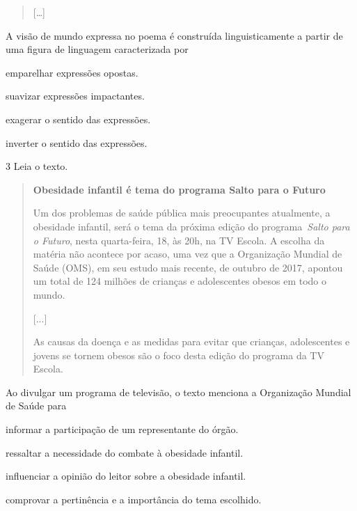 \begin{quote}
{[}\ldots{]}
\end{quote}


A visão de mundo expressa no poema é construída linguisticamente a
partir de uma figura de linguagem caracterizada por

\begin{escolha}
\item emparelhar expressões opostas.

\item suavizar expressões impactantes.

\item exagerar o sentido das expressões.

\item inverter o sentido das expressões.
\end{escolha}

\num{3} Leia o texto.

\begin{quote}
\centering\textbf{Obesidade infantil é tema do programa Salto para o Futuro}


Um dos problemas de saúde pública mais preocupantes atualmente, a
obesidade infantil, será o tema da próxima edição do
programa~\emph{Salto para o Futuro}, nesta quarta-feira, 18, às 20h, na
TV Escola. A escolha da matéria não acontece por acaso, uma vez que a
Organização Mundial de Saúde (OMS), em seu estudo mais recente, de
outubro de 2017, apontou um total de 124 milhões de crianças e
adolescentes obesos em todo o mundo.

{[}...{]}

As causas da doença e as medidas para evitar que crianças, adolescentes
e jovens se tornem obesos são o foco desta edição do programa da TV
Escola.
\end{quote}


Ao divulgar um programa de televisão, o texto menciona a Organização
Mundial de Saúde para

\begin{escolha}
\item informar a participação de um representante do órgão.

\item ressaltar a necessidade do combate à obesidade infantil.

\item influenciar a opinião do leitor sobre a obesidade infantil.

\item comprovar a pertinência e a importância do tema escolhido.
\end{escolha}

